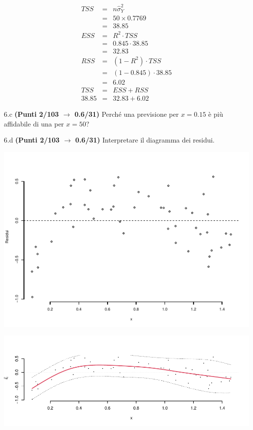 \documentclass[
  11pt,
]{book}
\theoremstyle{mytheoremstyle}
\theoremstyle{mydefstyle}
\newenvironment{sol}
  {
  \begin{tcolorbox}[enhanced,breakable,arc=0.1mm,boxrule=1pt,colback=white,colframe=iblue,
  title=\bf \fontfamily{lmss}\selectfont \hspace{.5 cm} Soluzione,drop fuzzy shadow]

}{
\end{tcolorbox}
  }
\begin{document}
\begin{sol}
\begin{eqnarray*}
   TSS &=& n\hat\sigma^2_Y\\
      &=& 50 \times 0.7769 \\
      &=&  38.85 \\
   ESS &=& R^2\cdot TSS\\
      &=&  0.845 \cdot 38.85 \\
      &=& 32.83 \\
   RSS &=& (1-R^2)\cdot TSS\\
      &=& (1- 0.845 )\cdot 38.85 \\
      &=&  6.02 \\
   TSS &=& ESS+RSS \\ 38.85  &=&  32.83 + 6.02 
  \end{eqnarray*}

\end{sol}

6.c \textbf{(Punti 2/103 \(\rightarrow\) 0.6/31)} Perché una previsione per \(x=0.15\) è più affidabile di una per \(x=50\)?

6.d \textbf{(Punti 2/103 \(\rightarrow\) 0.6/31)} Interpretare il diagramma dei residui.

\begin{center}\includegraphics{Esami_passati_con_soluzioni_files/figure-latex/2023-64,-1} \end{center}

\begin{sol}

\begin{center}\includegraphics{Esami_passati_con_soluzioni_files/figure-latex/2023-65,-1} \end{center}

\end{sol}
\end{document}
